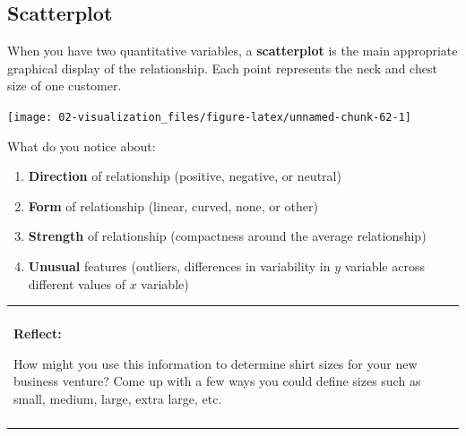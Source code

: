 \documentclass[
]{book}
\newenvironment{Shaded}{\begin{snugshade}}{\end{snugshade}}
\newcommand{\DataTypeTok}[1]{\textcolor[rgb]{0.13,0.29,0.53}{#1}}
\newcommand{\KeywordTok}[1]{\textcolor[rgb]{0.13,0.29,0.53}{\textbf{#1}}}
\newcommand{\NormalTok}[1]{#1}
\newcommand{\OperatorTok}[1]{\textcolor[rgb]{0.81,0.36,0.00}{\textbf{#1}}}
\newcommand{\StringTok}[1]{\textcolor[rgb]{0.31,0.60,0.02}{#1}}
\providecommand{\tightlist}{%
  \setlength{\itemsep}{0pt}\setlength{\parskip}{0pt}}
\newenvironment{reflect}
{
    \begin{center}
    
    \begin{tabular}{|p{0.8\textwidth}|}
    \rowcolor{LightBlue}
    \hline\\
    \rowcolor{LightBlue}
    \textbf{Reflect:}
}
{
    \\\rowcolor{LightBlue}
    \\\hline
    \end{tabular} 
    \end{center}
}
\begin{document}
\hypertarget{scatterplot}{%
\subsection{Scatterplot}\label{scatterplot}}

When you have two quantitative variables, a \textbf{scatterplot} is the main appropriate graphical display of the relationship. Each point represents the neck and chest size of one customer.

\begin{Shaded}
\end{Shaded}

\begin{center}\texttt{[image: 02-visualization\_files/figure-latex/unnamed-chunk-62-1]} \end{center}

What do you notice about:

\begin{enumerate}
\def\labelenumi{\arabic{enumi}.}
\tightlist
\item
  \textbf{Direction} of relationship (positive, negative, or neutral)
\item
  \textbf{Form} of relationship (linear, curved, none, or other)
\item
  \textbf{Strength} of relationship (compactness around the average relationship)
\item
  \textbf{Unusual} features (outliers, differences in variability in \(y\) variable across different values of \(x\) variable)
\end{enumerate}

\begin{reflect}
How might you use this information to determine shirt sizes for your new
business venture? Come up with a few ways you could define sizes such as
small, medium, large, extra large, etc.
\end{reflect}
\end{document}
